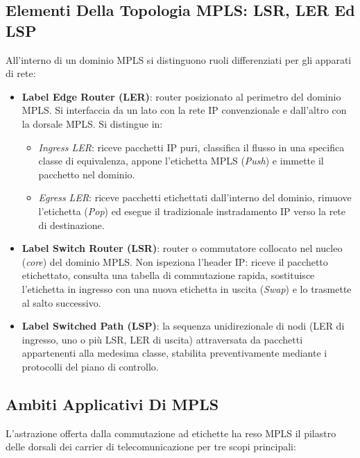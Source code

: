 \documentclass[11pt, a4paper]{article}
\begin{document}
\subsection{Elementi Della Topologia MPLS: LSR, LER Ed LSP}
All'interno di un dominio MPLS si distinguono ruoli differenziati per gli apparati di rete:
\begin{itemize}[noitemsep]
    \item \textbf{Label Edge Router (LER)}: router posizionato al perimetro del dominio MPLS. Si interfaccia da un lato con la rete IP convenzionale e dall'altro con la dorsale MPLS. Si distingue in:
    \begin{itemize}[noitemsep]
        \item \emph{Ingress LER}: riceve pacchetti IP puri, classifica il flusso in una specifica classe di equivalenza, appone l'etichetta MPLS (\emph{Push}) e immette il pacchetto nel dominio.
        \item \emph{Egress LER}: riceve pacchetti etichettati dall'interno del dominio, rimuove l'etichetta (\emph{Pop}) ed esegue il tradizionale instradamento IP verso la rete di destinazione.
    \end{itemize}
    \item \textbf{Label Switch Router (LSR)}: router o commutatore collocato nel nucleo (\emph{core}) del dominio MPLS. Non ispeziona l'header IP: riceve il pacchetto etichettato, consulta una tabella di commutazione rapida, sostituisce l'etichetta in ingresso con una nuova etichetta in uscita (\emph{Swap}) e lo trasmette al salto successivo.
    \item \textbf{Label Switched Path (LSP)}: la sequenza unidirezionale di nodi (LER di ingresso, uno o più LSR, LER di uscita) attraversata da pacchetti appartenenti alla medesima classe, stabilita preventivamente mediante i protocolli del piano di controllo.
\end{itemize}


\subsection{Ambiti Applicativi Di MPLS}
L'astrazione offerta dalla commutazione ad etichette ha reso MPLS il pilastro delle dorsali dei carrier di telecomunicazione per tre scopi principali:
\end{document}
